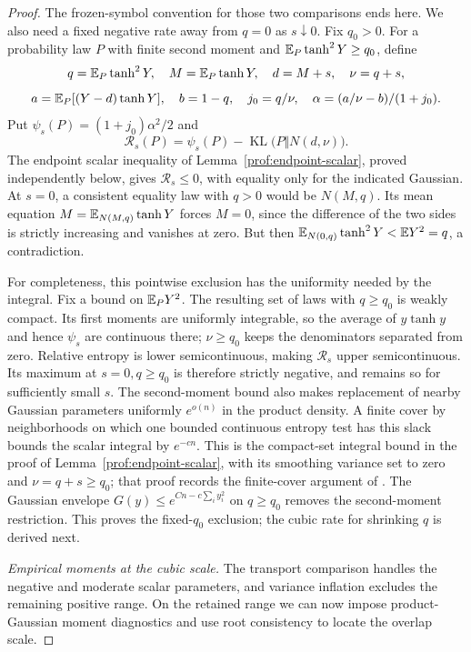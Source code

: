 \begin{proof}
The frozen-symbol convention for those two comparisons ends here.
We also need a fixed negative rate away from $q=0$ as $s\downarrow0$.
Fix $q_0>0$. For a probability law $P$ with finite second moment and $\mathbb E_P\tanh^2Y\ge q_0$, define
\[
 q=\mathbb E_P\tanh^2Y,\quad M=\mathbb E_P\tanh Y,\quad d=M+s,\quad \nu=q+s,
\]
\[
 a=\mathbb E_P[(Y-d)\tanh Y],\quad b=1-q,\quad j_0=q/\nu,\quad
 \alpha=(a/\nu-b)/(1+j_0).
\]
Put $\psi_s(P)=(1+j_0)\alpha^2/2$ and
\[
 \mathscr R_s(P)=\psi_s(P)
       -\operatorname{KL}\bigl(P\Vert N(d,\nu)\bigr).
\]
The endpoint scalar inequality of Lemma~\ref{prof:endpoint-scalar},
proved independently below, gives $\mathscr R_s\le0$, with equality
only for the indicated Gaussian. At $s=0$, a consistent equality law
with $q>0$ would be $N(M,q)$. Its mean equation
$M=\mathbb E_{N(M,q)}\tanh Y$ forces $M=0$, since the difference of the two
sides is strictly increasing and vanishes at zero. But then
$\mathbb E_{N(0,q)}\tanh^2Y<\mathbb E Y^2=q$, a contradiction.

For completeness, this pointwise exclusion has the uniformity needed
by the integral. Fix a bound on $\mathbb E_PY^2$. The resulting set of laws
with $q\ge q_0$ is weakly compact. Its first moments are
uniformly integrable, so the average of $y\tanh y$ and hence $\psi_s$
are continuous there; $\nu\ge q_0$ keeps the denominators separated
from zero. Relative entropy is lower semicontinuous, making
$\mathscr R_s$ upper semicontinuous. Its maximum at $s=0,q\ge q_0$
is therefore strictly negative, and remains so for sufficiently small
$s$. The second-moment bound also makes replacement of nearby Gaussian
parameters uniformly $e^{o(n)}$ in the product density. A finite cover
by neighborhoods on which one bounded continuous entropy test has
this slack bounds the scalar integral by $e^{-cn}$. This is the
compact-set integral bound in the proof of
Lemma~\ref{prof:endpoint-scalar}, with its smoothing variance set to zero
and $\nu=q+s\ge q_0$; that proof records the finite-cover argument of
\cite[Lemma~5.4]{AcceptedGap}.
The Gaussian envelope $G(y)\le e^{Cn-c\sum_i y_i^2}$ on $q\ge q_0$
removes the second-moment restriction. This proves the fixed-$q_0$
exclusion; the cubic rate for shrinking $q$ is derived next.

\par\smallskip\noindent\textit{Empirical moments at the cubic scale.}\enspace
The transport comparison handles the negative and moderate scalar
parameters, and variance inflation excludes the remaining positive
range. On the retained range we can now impose product-Gaussian
moment diagnostics and use root consistency to locate the overlap scale.


\end{proof}

